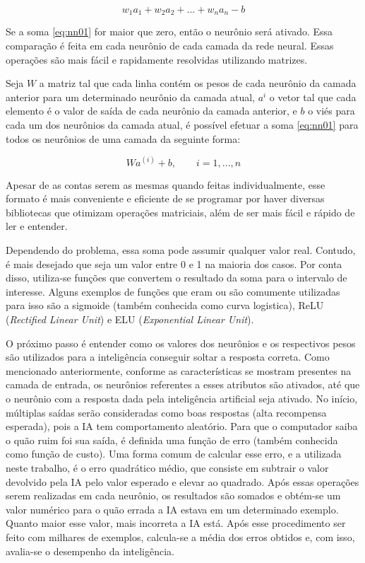 \begin{equation} \label{eq:nn01}
w_{1}a_{1} + w_{2}a_{2} + ... + w_{n}a_{n} - b
\end{equation}

Se a soma \ref{eq:nn01} for maior que zero, então o neurônio será ativado. Essa comparação é feita em cada neurônio de cada camada da rede neural.
Essas operações são mais fácil e rapidamente resolvidas utilizando matrizes.

Seja $W$ a matriz tal que cada linha contém os pesos de cada neurônio da camada anterior para um determinado neurônio da camada atual, $a^{i}$ o vetor tal que cada elemento é o valor de saída de cada neurônio da camada anterior, e $b$ o viés para cada um dos neurônios da camada atual, é possível efetuar a soma \ref{eq:nn01} para todos os neurônios de uma camada da seguinte forma:

\begin{equation} \label{eq:nn01}
Wa^{(i)} + b, \qquad i = 1, ..., n
\end{equation}

Apesar de as contas serem as mesmas quando feitas individualmente, esse formato é mais conveniente e eficiente de se programar por haver diversas bibliotecas que otimizam operações matriciais, além de ser mais fácil e rápido de ler e entender.

Dependendo do problema, essa soma pode assumir qualquer valor real. Contudo, é mais desejado que seja um valor entre 0 e 1 na maioria dos casos. Por conta disso, utiliza-se funções que convertem o resultado da soma para o intervalo de interesse. Alguns exemplos de funções que eram ou são comumente utilizadas para isso são a sigmoide (também conhecida como curva logistica), ReLU (\textit{Rectified Linear Unit}) e ELU (\textit{Exponential Linear Unit}).

O próximo passo é entender como os valores dos neurônios e os respectivos pesos são utilizados para a inteligência conseguir soltar a resposta correta.
Como mencionado anteriormente, conforme as características se mostram presentes na camada de entrada, os neurônios referentes a esses atributos são ativados, até que o neurônio com a resposta dada pela inteligência artificial seja ativado.
No início, múltiplas saídas serão consideradas como boas respostas (alta recompensa esperada), pois a IA tem comportamento aleatório.
Para que o computador saiba o quão ruim foi sua saída, é definida uma função de erro (também conhecida como função de custo). Uma forma comum de calcular esse erro, e a utilizada neste trabalho, é o erro quadrático médio, que consiste em subtrair o valor devolvido pela IA pelo valor esperado e elevar ao quadrado. Após essas operações serem realizadas em cada neurônio, os resultados são somados e obtém-se um valor numérico para o quão errada a IA estava em um determinado exemplo. Quanto maior esse valor, mais incorreta a IA está. Após esse procedimento ser feito com milhares de exemplos, calcula-se a média dos erros obtidos e, com isso, avalia-se o desempenho da inteligência.

